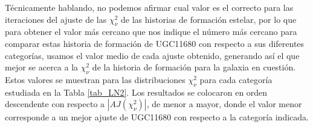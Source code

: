\bigskip

\noindent Técnicamente hablando, no podemos afirmar cual valor es el correcto para las iteraciones del ajuste de las $\chi^{2}_{\nu}$ de las historias de formación estelar, por lo que para obtener  el valor más cercano que nos indique el número más cercano para comparar  estas historia de formación de UGC11680 con respecto a sus diferentes categorías, usamos el valor medio de cada ajuste obtenido, generando así el que mejor se acerca a la $\chi^{2}_{\nu}$ de la historia de formación para la galaxia en cuestión. Estos valores se muestran para las distribuciones $\chi^{2}_{\nu}$ para cada categoría estudiada en la Tabla \ref{tab_LN2}. Los resultados se colocaron en orden descendente con respecto a $|AJ(\chi^2_{\nu})|$, de menor a mayor, donde el valor menor corresponde a un mejor ajuste de UGC11680 con respecto a la categoría indicada.



\bigskip

